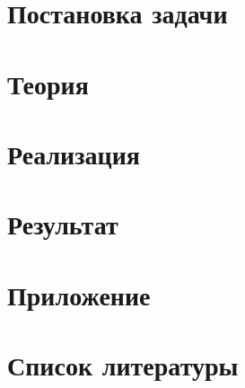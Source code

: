 \documentclass[a4paper,12pt]{article} %
\begin{document}
	
	\tableofcontents
	\listoffigures
	\listoftables
	\newpage
	\section{Постановка задачи}
	
	\newpage
	\section{Теория}
	
	\newpage
	\section{Реализация}
	
	\newpage
	\section{Результат}
	
	\newpage
	\section{Приложение}
	
	\newpage
	\section{Список литературы}
	
\end{document}
